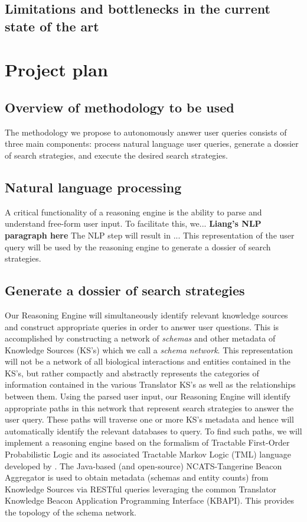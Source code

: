 \documentclass[11pt,notitlepage]{article}
\begin{document}
\subsection{Limitations and bottlenecks in the current state of the art}

\section{Project plan}
\subsection{Overview of methodology to be used}
The methodology we propose to autonomously answer user queries consists of three main components: process natural language user queries, generate a dossier of search strategies, and execute the desired search strategies.
\subsection{Natural language processing}
\label{section:NLP}
A critical functionality of a reasoning engine is the ability to parse and understand free-form user input. To facilitate this, we...
\textbf{Liang's NLP paragraph here}
The NLP step will result in ... This representation of the user query will be used by the reasoning engine to generate a dossier of search strategies. 
\subsection{Generate a dossier of search strategies}
\label{section:strategies}
Our Reasoning Engine will simultaneously identify relevant knowledge sources and construct appropriate queries in order to answer user questions. This is accomplished by constructing a network of \textit{schemas} and other metadata of Knowledge Sources (KS's) which we call a \textit{schema network}. This representation will not be a network of all biological interactions and entities contained in the KS's, but rather compactly and abstractly represents the categories of information contained in the various Translator KS's as well as the relationships between them. Using the parsed user input, our Reasoning Engine will identify appropriate paths in this network that represent search strategies to answer the user query. These paths will traverse one or more KS's metadata and hence will automatically identify the relevant databases to query. To find such paths, we will implement a reasoning engine based on the formalism of Tractable First-Order Probabilistic Logic and its associated Tractable Markov Logic (TML) language developed by \citet{Domingos:2012wi}. The Java-based (and open-source) NCATS-Tangerine Beacon Aggregator is used to obtain metadata (schemas and entity counts) from Knowledge Sources via RESTful queries leveraging the common Translator Knowledge Beacon Application Programming Interface (KBAPI). This provides the topology of the schema network. 
\end{document}
